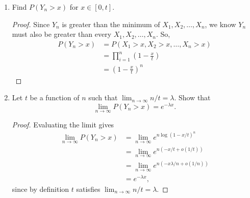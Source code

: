 \documentclass[oneside,reqno]{amsart}
\theoremstyle{definition}
\begin{document}
\begin{enumerate}
\item
Find $P(Y_n > x)$ for $x \in [0,t]$.
\begin{proof}
Since $Y_n$ is greater than the minimum of $X_1, X_2,\dotsc, X_n$, we know $Y_n$ must also be greater than every $X_1, X_2,\dotsc, X_n$. So,
\begin{align*}
	P(Y_n > x) &= P(X_1 > x, X_2 > x, \dotsc, X_n > x) \\
					  &= \prod_{i=1}^n \left( 1- \frac{x}{t} \right) \\
					  &= \left( 1- \frac{x}{t} \right)^n
\end{align*}
\end{proof}
\item
Let $t$ be a function of $n$ such that $\lim_{n \to \infty} n/t= \lambda$. Show that 
\[
	\lim_{n \to \infty} P(Y_n > x) = e^{-\lambda x}.
\]
\begin{proof}
Evaluating the limit gives
\begin{align*} 
	\lim_{n \to \infty} P(Y_n > x) &= \lim_{n \to \infty} e^{n \log( 1- x/t)^n }\\
		&= \lim_{n \to \infty} e^{n(-x/t + o(1/t))} \\
		&= \lim_{n \to \infty} e^{n(-x\lambda / n + o(1/n))} \\
		&= e^{-\lambda x},
\end{align*}
since by definition $t$ satisfies $\lim_{n \to \infty} n/t = \lambda$.
\end{proof}
\end{enumerate}
\end{document}

